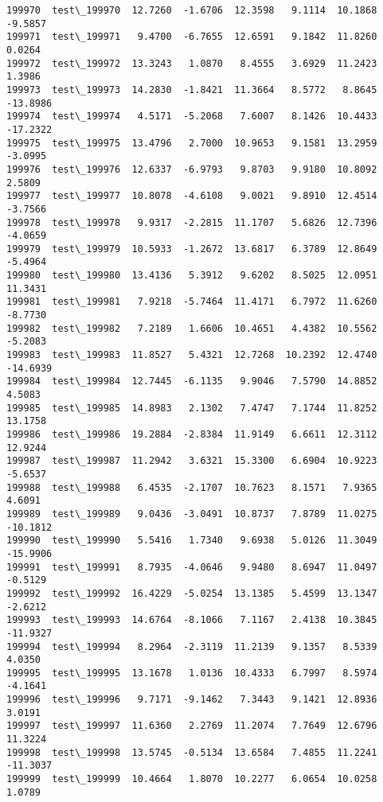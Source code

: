 \documentclass[11pt]{article}
\begin{document}
\begin{Verbatim}[commandchars=\\\{\}]
199970  test\_199970  12.7260  -1.6706  12.3598   9.1114  10.1868  -9.5857   
199971  test\_199971   9.4700  -6.7655  12.6591   9.1842  11.8260   0.0264   
199972  test\_199972  13.3243   1.0870   8.4555   3.6929  11.2423   1.3986   
199973  test\_199973  14.2830  -1.8421  11.3664   8.5772   8.8645 -13.8986   
199974  test\_199974   4.5171  -5.2068   7.6007   8.1426  10.4433 -17.2322   
199975  test\_199975  13.4796   2.7000  10.9653   9.1581  13.2959  -3.0995   
199976  test\_199976  12.6337  -6.9793   9.8703   9.9180  10.8092   2.5809   
199977  test\_199977  10.8078  -4.6108   9.0021   9.8910  12.4514  -3.7566   
199978  test\_199978   9.9317  -2.2815  11.1707   5.6826  12.7396  -4.0659   
199979  test\_199979  10.5933  -1.2672  13.6817   6.3789  12.8649  -5.4964   
199980  test\_199980  13.4136   5.3912   9.6202   8.5025  12.0951  11.3431   
199981  test\_199981   7.9218  -5.7464  11.4171   6.7972  11.6260  -8.7730   
199982  test\_199982   7.2189   1.6606  10.4651   4.4382  10.5562  -5.2083   
199983  test\_199983  11.8527   5.4321  12.7268  10.2392  12.4740 -14.6939   
199984  test\_199984  12.7445  -6.1135   9.9046   7.5790  14.8852   4.5083   
199985  test\_199985  14.8983   2.1302   7.4747   7.1744  11.8252  13.1758   
199986  test\_199986  19.2884  -2.8384  11.9149   6.6611  12.3112  12.9244   
199987  test\_199987  11.2942   3.6321  15.3300   6.6904  10.9223  -5.6537   
199988  test\_199988   6.4535  -2.1707  10.7623   8.1571   7.9365   4.6091   
199989  test\_199989   9.0436  -3.0491  10.8737   7.8789  11.0275 -10.1812   
199990  test\_199990   5.5416   1.7340   9.6938   5.0126  11.3049 -15.9906   
199991  test\_199991   8.7935  -4.0646   9.9480   8.6947  11.0497  -0.5129   
199992  test\_199992  16.4229  -5.0254  13.1385   5.4599  13.1347  -2.6212   
199993  test\_199993  14.6764  -8.1066   7.1167   2.4138  10.3845 -11.9327   
199994  test\_199994   8.2964  -2.3119  11.2139   9.1357   8.5339   4.0350   
199995  test\_199995  13.1678   1.0136  10.4333   6.7997   8.5974  -4.1641   
199996  test\_199996   9.7171  -9.1462   7.3443   9.1421  12.8936   3.0191   
199997  test\_199997  11.6360   2.2769  11.2074   7.7649  12.6796  11.3224   
199998  test\_199998  13.5745  -0.5134  13.6584   7.4855  11.2241 -11.3037   
199999  test\_199999  10.4664   1.8070  10.2277   6.0654  10.0258   1.0789   


\end{Verbatim}
\end{document}
